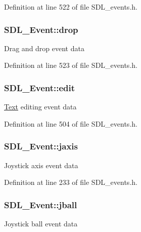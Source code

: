 Definition at line 522 of file S\+D\+L\+\_\+events.\+h.

\hypertarget{unionSDL__Event_acff77bccbca65abbb876360a3f5209c9}{
\subsubsection[{drop}]{ S\+D\+L\+\_\+\+Event\+::drop}}\label{unionSDL__Event_acff77bccbca65abbb876360a3f5209c9}
Drag and drop event data 

Definition at line 523 of file S\+D\+L\+\_\+events.\+h.

\hypertarget{unionSDL__Event_a9a7e3b67b2654d4c5fc509676c6a7183}{
\subsubsection[{edit}]{ S\+D\+L\+\_\+\+Event\+::edit}}\label{unionSDL__Event_a9a7e3b67b2654d4c5fc509676c6a7183}
\hyperlink{namespaceText}{Text} editing event data 

Definition at line 504 of file S\+D\+L\+\_\+events.\+h.

\hypertarget{unionSDL__Event_ac4611acd0e9c675e67dc20919f0accb4}{
\subsubsection[{jaxis}]{ S\+D\+L\+\_\+\+Event\+::jaxis}}\label{unionSDL__Event_ac4611acd0e9c675e67dc20919f0accb4}
Joystick axis event data 

Definition at line 233 of file S\+D\+L\+\_\+events.\+h.

\hypertarget{unionSDL__Event_ae433f511e3383d17f8fe02df745ee8f8}{
\subsubsection[{jball}]{ S\+D\+L\+\_\+\+Event\+::jball}}\label{unionSDL__Event_ae433f511e3383d17f8fe02df745ee8f8}
Joystick ball event data 

